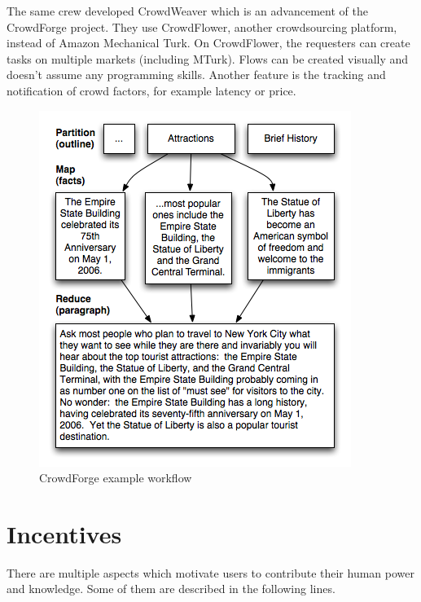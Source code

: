 The same crew developed CrowdWeaver\cite{crowdweaver} which is an advancement of the CrowdForge project. They use CrowdFlower, another crowdsourcing platform, instead of Amazon Mechanical Turk. On CrowdFlower, the requesters can create tasks on multiple markets (including MTurk). Flows can be created visually and doesn't assume any programming skills. Another feature is the tracking and notification of crowd factors, for example latency or price.
\begin{figure}
\centering
\includegraphics[scale=0.6]{images/crowdforge-article.png}
\caption{CrowdForge example workflow}
\label{crowdforgeflow}
\end{figure}
\section{Incentives}
There are multiple aspects which motivate users to contribute their human power and knowledge. Some of them are described in the following lines.
